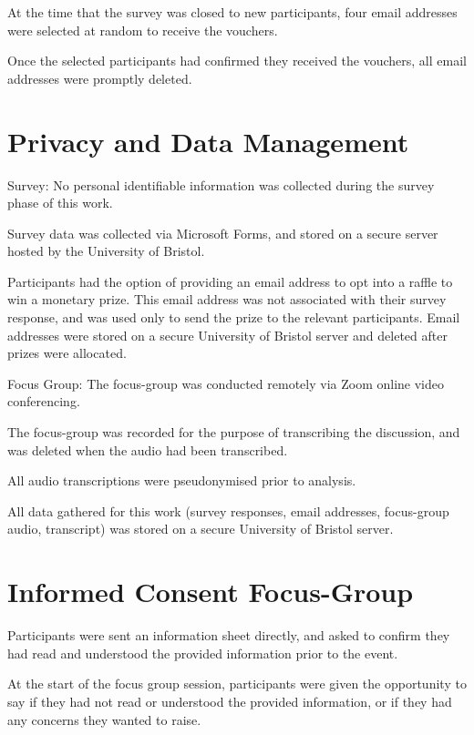 \documentclass[manuscript,screen,review]{acmart}
\begin{document}
At the time that the survey was closed to new participants, four email addresses were selected at random to receive the vouchers.

Once the selected participants had confirmed they received the vouchers, all email addresses were promptly deleted. 



\section{Privacy and Data Management}  


Survey:
No personal identifiable information was collected during the survey phase of this work.

Survey data was collected via Microsoft Forms, and stored on a secure server hosted by the University of Bristol.

Participants had the option of providing an email address to opt into a raffle to win a monetary prize. 
This email address was not associated with their survey response, and was used only to send the prize to the relevant participants. 
Email addresses were stored on a secure University of Bristol server and deleted after prizes were allocated.  

Focus Group:
The focus-group was conducted remotely via Zoom online video conferencing. 

The focus-group was recorded for the purpose of transcribing the discussion, and was deleted when the audio had been transcribed. 

All audio transcriptions were pseudonymised prior to analysis.

All data gathered for this work (survey responses, email addresses, focus-group audio, transcript) was stored on a secure University of Bristol server. 





 
\section{Informed Consent Focus-Group}  


Participants were sent an information sheet directly, and asked to confirm they had read and understood the provided information prior to the event.

At the start of the focus group session, participants were given the opportunity to say if they had not read or understood the provided information, or if they had any concerns they wanted to raise. 







 
\end{document}
